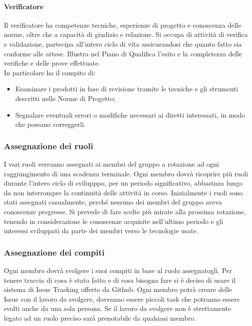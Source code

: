 \documentclass[../norme-di-progetto.tex]{subfiles}
\begin{document}
        \paragraph{Verificatore}
        Il verificatore ha competenze tecniche, esperienze di progetto e conoscenza delle norme, oltre che a capacità di giudizio e relazione. Si occupa di attività di verifica e validazione, partecipa all'intero ciclo di vita assicurandosi che quanto fatto sia conforme alle attese. Illustra nel Piano di Qualifica l'esito e la completezza delle verifiche e delle prove effettuate.\\
        In particolare ha il compito di:
        \begin{itemize}
            \item Esaminare i prodotti in fase di revisione tramite le tecniche e gli strumenti descritti nelle Norme di Progetto;
            \item Segnalare eventuali errori o modifiche necessari ai diretti interessati, in modo che possano correggerli.
        \end{itemize}

    \subsubsection{Assegnazione dei ruoli}
    I vari ruoli verranno assegnati ai membri del gruppo a rotazione ad ogni raggiungimento di una scadenza terminale. Ogni membro dovrà ricoprire più ruoli durante l'intero ciclo di svilupppo, per un periodo significativo, abbastnza lungo da non interrompre la continuità delle attività in corso.
    Inizialmente i ruoli sono stati assegnati casualmente, perché nessuno dei membri del gruppo aveva conoscenze pregresse. Si prevede di fare scelte più mirate alla prossima rotazione, tenendo in considerazione le conoscenze acquisite nell'ultimo periodo e gli interessi sviluppati da parte dei membri verso le tecnologie usate.
    \subsubsection{Assegnazione dei compiti}
    Ogni membro dovrà svolgere i suoi compiti in base al ruolo assegnatogli. Per tenere traccia di cosa è stato fatto e di cosa bisogna fare si è deciso di usare il sistema di Issue Tracking offerto da Github. Ogni membro potrà creare delle Issue con il lavoro da svolgere, dovranno essere piccoli task che potranno essere svolti anche da una sola persona. Se il lavoro da svolgere non è strettamente legato ad un ruolo preciso sarà prenotabile da qualsiasi membro.
\end{document}
